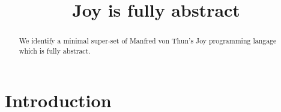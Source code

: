 \documentclass[a4paper,openany]{amsart}
\begin{document}
\sloppy

\title[Joy is fully abstract]{Joy is fully abstract}

%

\begin{abstract}
We identify a minimal super-set of Manfred von Thun's Joy programming langage which is fully abstract.
\end{abstract} 
\maketitle 
\tableofcontents 


\section{Introduction}



\printbibliography
\end{document}
